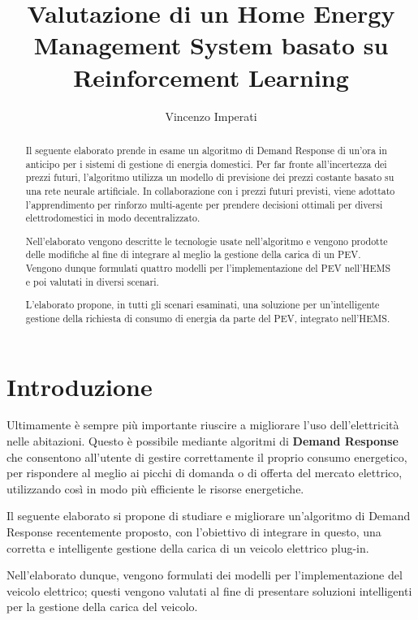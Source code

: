 \documentclass[italian, Lau, oneside]{sapthesis}
\title{Valutazione di un Home Energy Management System basato su Reinforcement Learning}
\author{Vincenzo Imperati}
\begin{document}
\frontmatter
\maketitle

\begin{abstract}
\indent
Il seguente elaborato prende in esame un algoritmo di Demand Response di un'ora in anticipo per i sistemi di gestione di energia domestici. Per far fronte all'incertezza dei prezzi futuri, l'algoritmo utilizza un modello di previsione dei prezzi costante basato su una rete neurale artificiale. In collaborazione con i prezzi futuri previsti, viene adottato l'apprendimento per rinforzo multi-agente per prendere decisioni ottimali per diversi elettrodomestici in modo decentralizzato.

Nell'elaborato vengono descritte le tecnologie usate nell'algoritmo e vengono prodotte delle modifiche al fine di integrare al meglio la gestione della carica di un PEV. Vengono dunque formulati quattro modelli per l'implementazione del PEV nell'HEMS e poi valutati in diversi scenari. 

L'elaborato propone, in tutti gli scenari esaminati, una soluzione per un'intelligente gestione della richiesta di consumo di energia da parte del PEV, integrato nell'HEMS.

\end{abstract}

\tableofcontents

\mainmatter
\chapter{Introduzione}
\label{chap:intro}
Ultimamente è sempre più importante riuscire a migliorare l'uso dell'elettricità nelle abitazioni. Questo è possibile mediante algoritmi di \textbf{Demand Response} che consentono all'utente di gestire correttamente il proprio consumo energetico, per rispondere al meglio ai picchi di domanda o di offerta del mercato elettrico, utilizzando così in modo più efficiente le risorse energetiche.

Il seguente elaborato si propone di studiare e migliorare un'algoritmo di Demand Response recentemente proposto, con l'obiettivo di integrare in questo, una corretta e intelligente gestione della carica di un veicolo elettrico plug-in. 

Nell'elaborato dunque, vengono formulati dei modelli per l'implementazione del veicolo elettrico; questi vengono valutati al fine di presentare soluzioni intelligenti per la gestione della carica del veicolo.
\end{document}
